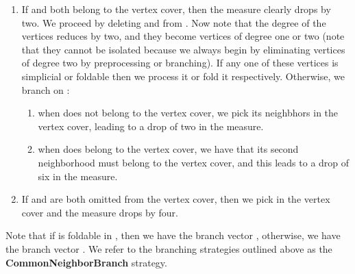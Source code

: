 \documentclass[svgnames]{llncs}
\newcommand{\branchvector}[1]{{\color{IndianRed}{}}}
\begin{document}
\begin{enumerate}
\item If  and  both belong to the vertex cover, then the measure clearly drops by two. We proceed by deleting  and  from . Now note that the degree of the vertices  reduces by two, 
and they become vertices of degree one or two (note that they cannot be isolated because we always begin by eliminating vertices of degree two by preprocessing or branching). If any one of these vertices is simplicial or
foldable then we process it or fold it respectively. Otherwise, we branch on :
\begin{enumerate}
\item when  does not belong to the vertex cover, we pick its neighbhors in the vertex cover, leading to a drop of two in the measure.
\item when  does belong to the vertex cover, we have that its second neighborhood must belong to the vertex cover, and this leads to a drop of six in the measure.
\end{enumerate}
\item If  and  are both omitted from the vertex cover, then we pick  in the vertex cover and the measure drops by four.


\end{enumerate}

Note that if  is foldable in , then we have the branch vector \branchvector{3,4}, otherwise, we have the branch vector \branchvector{4,8,4}.
We refer to the branching strategies outlined above as the {\bf CommonNeighborBranch} strategy.
\end{document}
